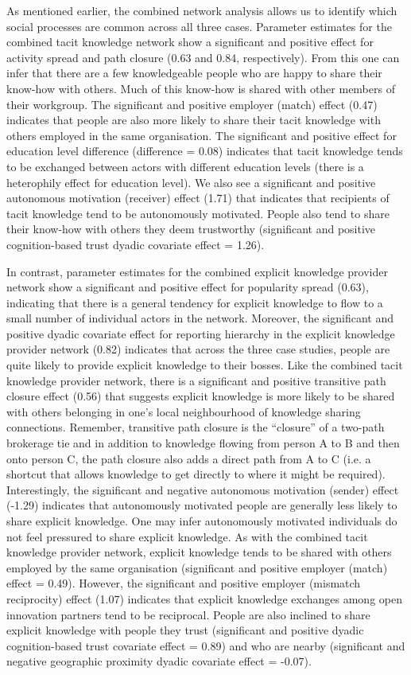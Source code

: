 As mentioned earlier, the combined network analysis allows us to identify which social processes are common across all three cases. Parameter estimates for the combined tacit knowledge network show a significant and positive effect for activity spread and path closure (0.63 and 0.84, respectively). From this one can infer that there are a few knowledgeable people who are happy to share their know-how with others. Much of this know-how is shared with other members of their workgroup. The significant and positive employer (match) effect (0.47) indicates that people are also more likely to share their tacit knowledge with others employed in the same organisation. The significant and positive effect for education level difference (difference = 0.08) indicates that tacit knowledge tends to be exchanged between actors with different education levels (there is a heterophily effect for education level). We also see a significant and positive autonomous motivation (receiver) effect (1.71) that indicates that recipients of tacit knowledge tend to be autonomously motivated. People also tend to share their know-how with others they deem trustworthy (significant and positive cognition-based trust dyadic covariate effect = 1.26). \medskip

In contrast, parameter estimates for the combined explicit knowledge provider network show a significant and positive effect for popularity spread (0.63), indicating that there is a general tendency for explicit knowledge to flow to a small number of individual actors in the network. Moreover, the significant and positive dyadic covariate effect for reporting hierarchy in the explicit knowledge provider network (0.82) indicates that across the three case studies, people are quite likely to provide explicit knowledge to their bosses. Like the combined tacit knowledge provider network, there is a significant and positive transitive path closure effect (0.56) that suggests explicit knowledge is more likely to be shared with others belonging in one's local neighbourhood of knowledge sharing connections. Remember, transitive path closure is the \enquote{closure} of a two-path brokerage tie and in addition to knowledge flowing from person A to B and then onto person C, the path closure also adds a direct path from A to C (i.e. a shortcut that allows knowledge to get directly to where it might be required). Interestingly, the significant and negative autonomous motivation (sender) effect (-1.29) indicates that autonomously motivated people are generally less likely to share explicit knowledge. One may infer autonomously motivated individuals do not feel pressured to share explicit knowledge. As with the combined tacit knowledge provider network, explicit knowledge tends to be shared with others employed by the same organisation (significant and positive employer (match) effect = 0.49). However, the significant and positive employer (mismatch reciprocity) effect (1.07) indicates that explicit knowledge exchanges among open innovation partners tend to be reciprocal. People are also inclined to share explicit knowledge with people they trust (significant and positive dyadic cognition-based trust covariate effect = 0.89) and who are nearby (significant and negative geographic proximity dyadic covariate effect = -0.07). \medskip

